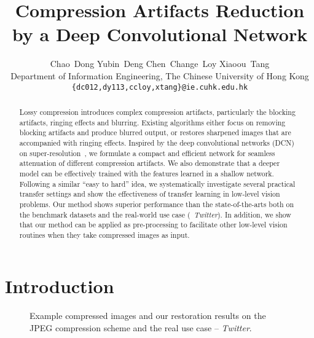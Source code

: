 \documentclass[10pt,twocolumn,letterpaper]{article}
\begin{document}
\title{Compression Artifacts Reduction by a Deep Convolutional Network}

\author{Chao~Dong \qquad Yubin~Deng \qquad Chen~Change~Loy \qquad Xiaoou~Tang\\
Department of Information Engineering, The Chinese University of Hong Kong\\
{\tt\small \{dc012,dy113,ccloy,xtang\}@ie.cuhk.edu.hk}
}





\maketitle
\thispagestyle{empty}


\begin{abstract}
Lossy compression introduces complex compression artifacts, particularly the blocking artifacts, ringing effects and blurring. Existing algorithms either focus on removing blocking artifacts and produce blurred output, or restores sharpened images that are accompanied with ringing effects.
Inspired by the deep convolutional networks (DCN) on super-resolution~\cite{Dong2014}, we formulate a compact and efficient network for seamless attenuation of different compression artifacts.
We also demonstrate that a deeper model can be effectively trained with the features learned in a shallow network. Following a similar ``easy to hard'' idea, we systematically investigate several practical transfer settings and show the effectiveness of transfer learning in low-level vision problems.
Our method shows superior performance than the state-of-the-arts both on the benchmark datasets and the real-world use case  (\ie~\textit{Twitter}).
In addition, we show that our method can be applied as pre-processing to facilitate other low-level vision routines when they take compressed images as input.
\end{abstract}
\section{Introduction}
\label{sec:introduction}
\begin{figure}[t]\footnotesize
\centering
{}
\vskip -0.1cm

\vskip -0.1cm
  \label{fig:introduction}
  \caption{Example compressed images and our restoration results on the JPEG compression scheme and the real use case -- \textit{Twitter}.}
\vskip -0.5cm
\end{figure}
\end{document}
